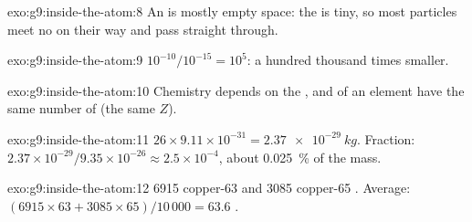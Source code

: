 \begin{solution}{exo:g9:inside-the-atom:8}
An  is mostly empty space: the  is tiny, so most particles
meet no  on their way and pass straight through.
\end{solution}

\begin{solution}{exo:g9:inside-the-atom:9}
$10^{-10} / 10^{-15} = 10^{5}$: a hundred thousand times smaller.
\end{solution}

\begin{solution}{exo:g9:inside-the-atom:10}
Chemistry depends on the , and  of an element have the
same number of  (the same $Z$).
\end{solution}

\begin{solution}{exo:g9:inside-the-atom:11}
$26 \times 9.11 \times 10^{-31} = \qty{2.37e-29}{kg}$. Fraction:
$2.37 \times 10^{-29} / 9.35 \times 10^{-26} \approx 2.5 \times
10^{-4}$, about \qty{0.025}{\percent} of the mass.
\end{solution}

\begin{solution}{exo:g9:inside-the-atom:12}
6915 copper-63  and 3085 copper-65 . Average:
$(6915 \times 63 + 3085 \times 65)/10\,000 = 63.6$ .
\end{solution}


